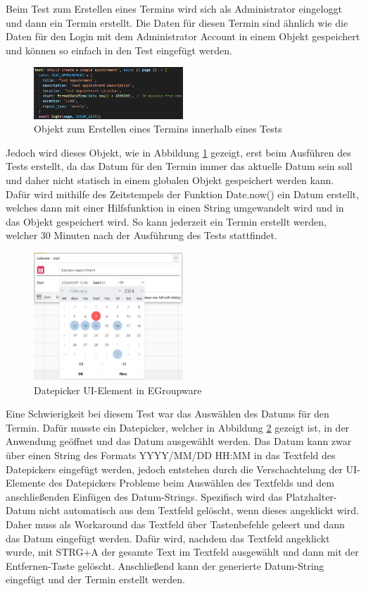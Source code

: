 Beim Test zum Erstellen eines Termins wird sich als Administrator eingeloggt und dann ein Termin erstellt.
Die Daten für diesen Termin sind ähnlich wie die Daten für den Login mit dem Administrator Account in einem Objekt gespeichert und können so einfach in den Test eingefügt werden.
\begin{figure}[H]
    \centering
    \includegraphics[width=0.5\textwidth]{images/AppointmentObject.png}
    \caption{Objekt zum Erstellen eines Termins innerhalb eines Tests}
    \label{fig:appointment-object}
\end{figure}
Jedoch wird dieses Objekt, wie in Abbildung \ref{fig:appointment-object} gezeigt, erst beim Ausführen des Tests erstellt, da das Datum für den Termin immer das aktuelle Datum sein soll und daher nicht statisch in einem globalen Objekt gespeichert werden kann.
Dafür wird mithilfe des Zeitstempels der Funktion Date.now() ein Datum erstellt, welches dann mit einer Hilfsfunktion in einen String umgewandelt wird und in das Objekt gespeichert wird.
So kann jederzeit ein Termin erstellt werden, welcher 30 Minuten nach der Ausführung des Tests stattfindet.
\begin{figure}[H]
    \centering
    \includegraphics[width=0.5\textwidth]{images/Datepicker.png}
    \caption{Datepicker UI-Element in EGroupware}
    \label{fig:datepicker}
\end{figure}
Eine Schwierigkeit bei diesem Test war das Auswählen des Datums für den Termin.
Dafür musste ein Datepicker, welcher in Abbildung \ref{fig:datepicker} gezeigt ist, in der Anwendung geöffnet und das Datum ausgewählt werden.
Das Datum kann zwar über einen String des Formats YYYY/MM/DD HH:MM in das Textfeld des Datepickers eingefügt werden, jedoch entstehen durch die Verschachtelung der UI-Elemente des Datepickers Probleme beim Auswählen des Textfelds und dem anschließenden Einfügen des Datum-Strings.
Spezifisch wird das Platzhalter-Datum nicht automatisch aus dem Textfeld gelöscht, wenn dieses angeklickt wird.
Daher muss als Workaround das Textfeld über Tastenbefehle geleert und dann das Datum eingefügt werden.
Dafür wird, nachdem das Textfeld angeklickt wurde, mit STRG+A der gesamte Text im Textfeld ausgewählt und dann mit der Entfernen-Taste gelöscht.
Anschließend kann der generierte Datum-String eingefügt und der Termin erstellt werden.

